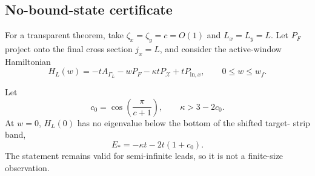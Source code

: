 \subsection{No-bound-state certificate}

For a transparent theorem, take $\zeta_x=\zeta_y=c=O(1)$ and
$L_x=L_y=L$.  Let $P_F$ project onto the final cross section $j_x=L$, and
consider the active-window Hamiltonian
\begin{equation}
 H_L(w)=-tA_{\Gamma_L}-wP_F
 -\kappa tP_{\mathcal X}+tP_{\mathrm{in},x},
 \qquad 0\leq w\leq w_f .
 \label{eq:mwis-active-H}
\end{equation}

\begin{proposition}
\label{prop:mwis-no-bound-state}
Let
\begin{equation}
 c_0=\cos\!\left(\frac{\pi}{c+1}\right),\qquad
 \kappa>3-2c_0.
 \label{eq:mwis-kappa-condition}
\end{equation}
At $w=0$, $H_L(0)$ has no eigenvalue below the bottom of the shifted target-
strip band,
\begin{equation}
 E_*=-\kappa t-2t(1+c_0).
 \label{eq:mwis-shifted-threshold}
\end{equation}
The statement remains valid for semi-infinite leads, so it is not a
finite-size observation.
\end{proposition}

